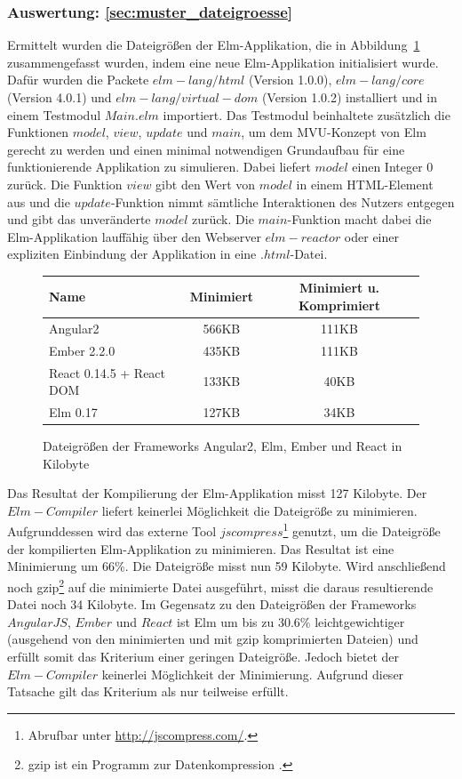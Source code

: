 \subsubsection{Auswertung: \ref{sec:muster_dateigroesse} }
Ermittelt wurden die Dateigrößen der Elm-Applikation, die in Abbildung~\ref{fig:dateigroesse-stats} zusammengefasst wurden, indem eine neue Elm-Applikation initialisiert wurde. Dafür wurden die Packete $elm-lang/html$ (Version 1.0.0), $elm-lang/core$ (Version 4.0.1) und $elm-lang/virtual-dom$ (Version 1.0.2) installiert und in einem Testmodul $Main.elm$ importiert.
Das Testmodul beinhaltete zusätzlich die Funktionen $model$, $view$, $update$ und $main$, um dem \ac{MVU}-Konzept von Elm gerecht zu werden und einen minimal notwendigen Grundaufbau für eine funktionierende Applikation zu simulieren. Dabei liefert $model$ einen Integer $0$ zurück. Die Funktion $view$ gibt den Wert von $model$ in einem \ac{HTML}-Element aus und die $update$-Funktion nimmt sämtliche Interaktionen des Nutzers entgegen und gibt das unveränderte $model$ zurück. Die $main$-Funktion macht dabei die Elm-Applikation lauffähig über den Webserver $elm-reactor$ oder einer expliziten Einbindung der Applikation in eine $.html$-Datei. 
\begin{figure}[h!]
\centering
	\begin{tabular}{ | p{5cm} | c | c |}
	\hline
	 \textbf{Name} 				& \textbf{Minimiert} 	& \textbf{Minimiert u. Komprimiert}\\
	 \hline
	 Angular2 					& 566KB	& 111KB\\
	 \hline
	 Ember 2.2.0 				& 435KB & 111KB\\
	 \hline
	 React 0.14.5 + React DOM	& 133KB & 40KB\\
	 \hline
	 Elm 0.17					& 127KB & 34KB\\
	 \hline
	\end{tabular}
\caption{Dateigrößen der Frameworks Angular2, Elm, Ember und React in Kilobyte}\label{fig:dateigroesse-stats}
\end{figure}
Das Resultat der Kompilierung der Elm-Applikation misst 127 Kilobyte. Der $Elm-Compiler$ liefert keinerlei Möglichkeit die Dateigröße zu minimieren. Aufgrunddessen wird das externe Tool $jscompress$\footnote{Abrufbar unter \url{http://jscompress.com/}.} genutzt, um die Dateigröße der kompilierten Elm-Applikation zu minimieren. Das Resultat ist eine Minimierung um 66\%. Die Dateigröße misst nun 59 Kilobyte. Wird anschließend noch gzip\footnote{gzip ist ein Programm zur Datenkompression \cite[Vgl.]{google-gzip}.} auf die minimierte Datei ausgeführt, misst die daraus resultierende Datei noch 34 Kilobyte. Im Gegensatz zu den Dateigrößen der Frameworks $AngularJS$, $Ember$ und $React$ ist Elm um bis zu 30.6\% leichtgewichtiger (ausgehend von den minimierten und mit gzip komprimierten Dateien) und erfüllt somit das Kriterium einer geringen Dateigröße. Jedoch bietet der $Elm-Compiler$ keinerlei Möglichkeit der Minimierung. Aufgrund dieser Tatsache gilt das Kriterium als nur teilweise erfüllt.